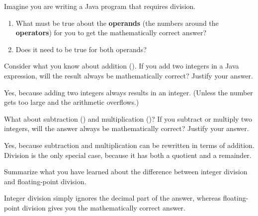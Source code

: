 \Q Imagine you are writing a Java program that requires division.

\begin{enumerate}

\item What must be true about the \textbf{operands} (the numbers around the \textbf{operators}) for you to get the mathematically correct answer?


\item Does it need to be true for both operands? 

\end{enumerate}


\Q Consider what you know about addition (\java{+}).
If you add two integers in a Java expression, will the result always be mathematically correct?
Justify your answer.

\begin{answer}[5em]
Yes, because adding two integers always results in an integer.
(Unless the number gets too large and the arithmetic overflows.)
\end{answer}


\Q What about subtraction (\java{-}) and multiplication (\java{*})? If you subtract or multiply two integers, will the answer always be mathematically correct? Justify your answer.

\begin{answer}[5em]
Yes, because subtraction and multiplication can be rewritten in terms of addition.
Division is the only special case, because it has both a quotient and a remainder.
\end{answer}


\Q Summarize what you have learned about the difference between integer division and floating-point division.

\begin{answer}[5em]
Integer division simply ignores the decimal part of the answer, whereas floating-point division gives you the mathematically correct answer.
\end{answer}